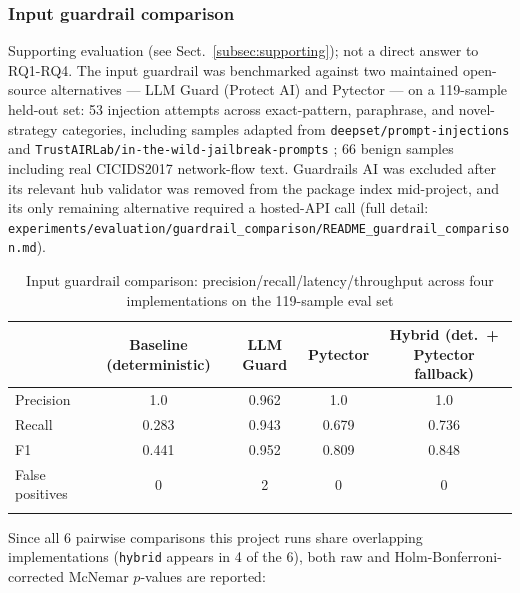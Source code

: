 \documentclass[pdflatex,sn-mathphys-num]{sn-jnl}%
\begin{document}
\subsubsection{Input guardrail comparison}\label{subsubsec:inputguardrailcomparison}

Supporting evaluation (see Sect.~\ref{subsec:supporting}); not a direct
answer to RQ1-RQ4. The input guardrail was benchmarked against two maintained open-source
alternatives --- LLM Guard \cite{llmguard2024} (Protect AI) and
Pytector --- on a 119-sample held-out set: 53 injection attempts across
exact-pattern, paraphrase, and novel-strategy categories, including
samples adapted from \texttt{deepset/prompt-injections}
\cite{deepsetpromptinjections2023} and
\texttt{TrustAIRLab/in-the-wild-jailbreak-prompts} \cite{trustairlab2024};
66 benign samples including real CICIDS2017 network-flow text.
Guardrails AI was excluded after its relevant hub validator was removed
from the package index mid-project, and its only remaining alternative
required a hosted-API call (full detail:
\texttt{experiments/evaluation/guardrail\_comparison/README\_guardrail\_comparison.md}).

\begin{table}[h]
\caption{Input guardrail comparison: precision/recall/latency/throughput across four implementations on the 119-sample eval set}\label{tab:inputguardrail}
\begin{tabular}{@{}lcccc@{}}
\toprule
 & Baseline (deterministic) & LLM Guard & Pytector & Hybrid (det.\ + Pytector fallback) \\
\midrule
Precision & 1.0 & 0.962 & 1.0 & 1.0 \\
Recall & 0.283 & 0.943 & 0.679 & 0.736 \\
F1 & 0.441 & 0.952 & 0.809 & 0.848 \\
False positives & 0 & 2 & 0 & 0 \\
\botrule
\end{tabular}
\end{table}

Since all 6 pairwise comparisons this project runs share overlapping
implementations (\texttt{hybrid} appears in 4 of the 6), both raw and
Holm-Bonferroni-corrected McNemar $p$-values are reported:
\end{document}
